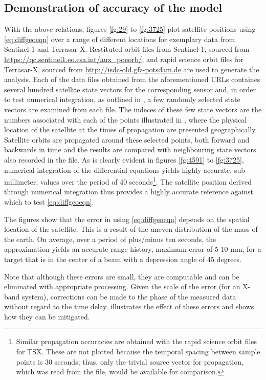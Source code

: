 \subsection{Demonstration of accuracy of the model}
With the above relations, figures \ref{fg:29} to \ref{fg:3725} plot satellite positions using \eqref{eq:diffgeoeqn} over a range of different locations for exemplary data from Sentinel-1 and Terrasar-X. Restituted orbit files from Sentinel-1, sourced from \url{https://qc.sentinel1.eo.esa.int/aux\_poeorb/}, and rapid science orbit files for Terrasar-X, sourced from \url{http://isdc-old.gfz-potsdam.de} are used to generate the analysis. Each of the data files obtained from the aforementioned URLs containes several hundred satellite state vectors for the corresponding sensor and, in order to test numerical integration, as outlined in , a few randomly selected state vectors are examined from each file. The indeces of these few state vectors are the numbers associated with each of the points illustrated in , where the physical location of the satellite at the times of propagation are presented geographically. Satellite orbits are propagated around these selected points, both forward and backwards in time and the results are compared with neighbouring state vectors also recorded in the file. As is clearly evident in figures \ref{fg:4591} to \ref{fg:3725}, numerical integration of the differential equations yields highly accurate, sub-millimeter, values over the period of 40 seconds\footnote{Similar propagation accuracies are obtained with the rapid science orbit files for TSX. These are not plotted because the temporal spacing between sample points is 30 seconds; thus, only the trivial source vector for propagation, which was read from the file, would be available for comparison.}. The satellite position derived through numerical integration thus provides a highly accurate reference against which to test \eqref{eq:diffgeoeqn}. 
\par
The figures show that the error in using \eqref{eq:diffgeoeqn} depends on the spatial location of the satellite. This is a result of the uneven distribution of the mass of the earth. On average, over a period of plus/minus ten seconds, the approximation yields an accurate range history, maximum error of 5-10 mm, for a target that is in the center of a beam with a depression angle of 45 degrees. 
\par
Note that although these errors are small, they are computable and can be eliminated with appropriate processing. Given the scale of the error (for an X-band system), corrections can be made to the phase of the measured data without regard to the time delay.   illustrates the effect of these errors and shows how they can be mitigated.  
